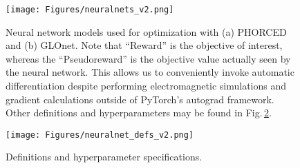 \documentclass{article}
\begin{document}
\begin{figure}[h!]
    \centering
    \texttt{[image: Figures/neuralnets\_v2.png]}
    \caption{Neural network models used for optimization with (a) PHORCED and (b) GLOnet. Note that ``Reward'' is the objective of interest, whereas the ``Pseudoreward'' is the objective value actually seen by the neural network. This allows us to conveniently invoke automatic differentiation despite performing electromagnetic simulations and gradient calculations outside of PyTorch's autograd framework. Other definitions and hyperparameters may be found in Fig.\,\ref{fig:defs}.}
    \label{fig:nets}
\end{figure}

\begin{figure}[h!]
    \centering
    \texttt{[image: Figures/neuralnet\_defs\_v2.png]}
    \caption{Definitions and hyperparameter specifications.}
    \label{fig:defs}
\end{figure}
\newpage

\printbibliography


%
%



\end{document}
